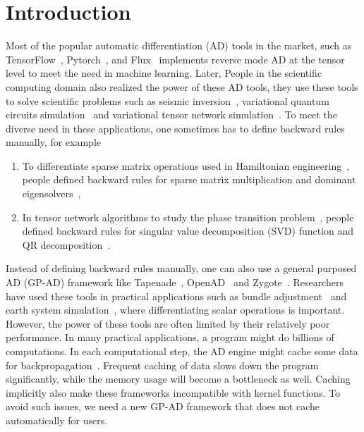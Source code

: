 \documentclass{article}
\newcommand{\<}{\langle}
\renewcommand{\>}{\rangle}
\theoremstyle{definition}\newtheorem{definition}{\textit{Definition}}
\begin{document}
\section{Introduction}\label{sec:intro}
  Most of the popular automatic differentiation (AD) tools in the market, such as TensorFlow~\cite{Tensorflow2015}, Pytorch~\cite{Paszke2017}, and Flux~\cite{Innes2018a} implements reverse mode AD at the tensor level to meet the need in machine learning. Later, People in the scientific computing domain also realized the power of these AD tools, they use these tools to solve scientific problems such as seismic inversion~\cite{Zhu2020}, variational quantum circuits simulation~\cite{Bergholm2018,Luo2019} and variational tensor network simulation~\cite{Liao2019,Roberts2019}. To meet the diverse need in these applications, one sometimes has to define backward rules manually, for example
\begin{enumerate}
\item To differentiate sparse matrix operations used in Hamiltonian engineering~\cite{Xie2020}, people defined backward rules for sparse matrix multiplication and dominant eigensolvers~\cite{Golub2012},
\item In tensor network algorithms to study the phase transition problem~\cite{Liao2019,Seeger2017,Wan2019,Hubig2019}, people defined backward rules for singular value decomposition (SVD) function and QR decomposition~\cite{Golub2012}.
\end{enumerate}
Instead of defining backward rules manually, one can also use a general purposed AD (GP-AD) framework like Tapenade~\cite{Hascoet2013}, OpenAD~\cite{Utke2008} and Zygote~\cite{Innes2018, Innes2019}.
Researchers have used these tools in practical applications such as bundle adjustment~\cite{Shen2018} and earth system simulation~\cite{Forget2015}, where differentiating scalar operations is important.
However, the power of these tools are often limited by their relatively poor performance. In many practical applications, a program might do billions of computations. In each computational step, the AD engine might cache some data for backpropagation~\cite{Griewank2008}. Frequent caching of data slows down the program significantly, while the memory usage will become a bottleneck as well. Caching implicitly also make these frameworks incompatible with kernel functions.
To avoid such issues, we need a new GP-AD framework that does not cache automatically for users.
\end{document}

